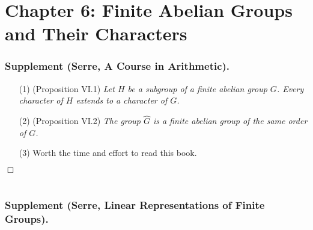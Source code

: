 \documentclass{article}
\begin{document}









\newpage
\section*{Chapter 6: Finite Abelian Groups and Their Characters \\}






\subsubsection*{Supplement (Serre, A Course in Arithmetic).}



\begin{enumerate}
\item[(1)]
  (Proposition VI.1)
  \emph{Let $H$ be a subgroup of a finite abelian group $G$.
  Every character of $H$ extends to a character of $G$.}

\item[(2)]
  (Proposition VI.2)
  \emph{The group $\widehat{G}$ is a finite abelian group of the same order of $G$.}

\item[(3)]
  Worth the time and effort to read this book.
\end{enumerate}
$\Box$ \\\\






\subsubsection*{Supplement (Serre, Linear Representations of Finite Groups).}
\end{document}
